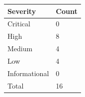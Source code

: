 \documentclass{article}
\begin{document}
                \begin{minipage}{.40\textwidth}
                \renewcommand{\arraystretch}{1.63}
                \begin{tabular}{|p{11em}|>{\centering\arraybackslash}p{6em}|}
                \hline
                \normalsize \cellcolor{black!10} \textbf{Severity} & \normalsize \cellcolor{black!10} \textbf{Count} \\
                 \hline
                 \normalsize Critical &   \normalsize \cellcolor{critical} 0  \\
                 \hline
                 \normalsize High & \normalsize \cellcolor{high} 8 \\
                 \hline
                 \normalsize Medium & \normalsize \cellcolor{medium} 4 \\
                 \hline
                 \normalsize Low & \normalsize \cellcolor{low} 4 \\
                 \hline
                 \normalsize Informational & \normalsize \cellcolor{info} 0 \\
                 \hline
                 \normalsize Total & \normalsize \cellcolor{total} 16 \\
                 \hline    
                \end{tabular}
                \end{minipage}

 

            \newpage
\end{document}
